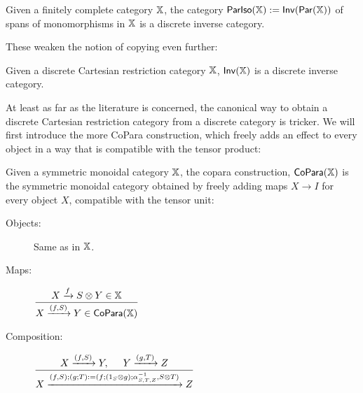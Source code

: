\begin{lemma}
Given a finitely complete category $\mathbb{X}$, the category  $\mathsf{ParIso}(\mathbb{X}):=\mathsf{Inv}(\mathsf{Par}(\mathbb{X}))$ of spans of monomorphisms in $\mathbb{X}$ is a discrete inverse category.
\end{lemma}
These weaken the notion of copying even further:
\begin{lemma}
Given a discrete Cartesian restriction category $\mathbb{X}$, $\mathsf{Inv}(\mathbb{X})$ is a discrete inverse category.
\end{lemma}
At least as far as the literature is concerned, the canonical way to obtain a discrete Cartesian restriction category from a discrete category is tricker.  We will first introduce the more CoPara construction, which freely adds an effect to every object in a way that is compatible with the tensor product:
\begin{definition}
Given a symmetric monoidal category $\mathbb{X}$, the copara construction, ${\sf CoPara}(\mathbb{X})$ is the symmetric monoidal category obtained by freely adding maps $X\to I$ for every object $X$, compatible with the tensor unit:
\begin{description}
\item[Objects:] Same as in $\mathbb{X}$.
\item[Maps:]  
\hfil $
\dfrac{ X\xrightarrow{f}  S\otimes Y \in \mathbb{X}           }
         { X\xrightarrow{(f,S)} Y \in  {\sf CoPara}(\mathbb{X}) }
$
\item[Composition:]
\hfil $
\dfrac{
	X\xrightarrow{(f,S)} Y , \hspace*{.5cm} Y\xrightarrow{(g,T)} Z }
         {X\xrightarrow{
		(f,S);(g;T) := (f;(1_S \otimes g);\alpha^{-1}_{S,T,Z} ,S\otimes T)}Z} 
$



\end{description}
\end{definition}
